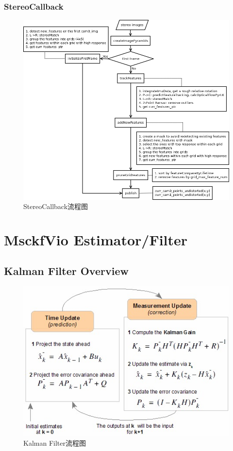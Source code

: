 \documentclass[12pt,a4paper]{article}
\begin{document}
\subsubsection{StereoCallback}

\begin{figure}[!htbp]
\centering
\includegraphics[scale=0.6]{images/stereo_cb.png}
\caption{StereoCallback流程图}
\end{figure}


\newpage
\section{MsckfVio Estimator/Filter}

\subsection{Kalman Filter Overview}

\begin{figure}[!htbp]
\centering
\includegraphics[scale=0.7]{images/kf_flow.jpg}
\caption{Kalman Filter流程图}
\end{figure}
\end{document}
